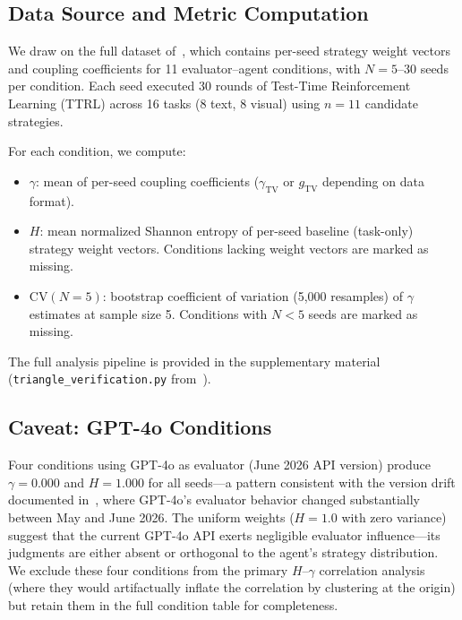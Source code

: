\documentclass[11pt]{article}
\begin{document}
\subsection{Data Source and Metric Computation}

We draw on the full dataset of~\cite{liu2026mmepc}, which contains per-seed strategy weight vectors and coupling coefficients for 11 evaluator--agent conditions, with $N = 5$--30 seeds per condition. Each seed executed 30 rounds of Test-Time Reinforcement Learning (TTRL) across 16 tasks (8 text, 8 visual) using $n = 11$ candidate strategies.

For each condition, we compute:
\begin{itemize}[leftmargin=*,nosep]
 \item $\gamma$: mean of per-seed coupling coefficients ($\gamma_{\text{TV}}$ or $g_{\text{TV}}$ depending on data format).
 \item $H$: mean normalized Shannon entropy of per-seed baseline (task-only) strategy weight vectors. Conditions lacking weight vectors are marked as missing.
 \item $\text{CV}(N{=}5)$: bootstrap coefficient of variation (5,000 resamples) of $\gamma$ estimates at sample size 5. Conditions with $N < 5$ seeds are marked as missing.
\end{itemize}

The full analysis pipeline is provided in the supplementary material (\texttt{triangle\_verification.py} from~\cite{liu2026triangle}).

\subsection{Caveat: GPT-4o Conditions}
\label{sec:caveat}

Four conditions using GPT-4o as evaluator (June 2026 API version) produce $\gamma = 0.000$ and $H = 1.000$ for all seeds---a pattern consistent with the version drift documented in~\cite{liu2026mmepc}, where GPT-4o's evaluator behavior changed substantially between May and June 2026. The uniform weights ($H = 1.0$ with zero variance) suggest that the current GPT-4o API exerts negligible evaluator influence---its judgments are either absent or orthogonal to the agent's strategy distribution. We exclude these four conditions from the primary $H$--$\gamma$ correlation analysis (where they would artifactually inflate the correlation by clustering at the origin) but retain them in the full condition table for completeness.
\end{document}
